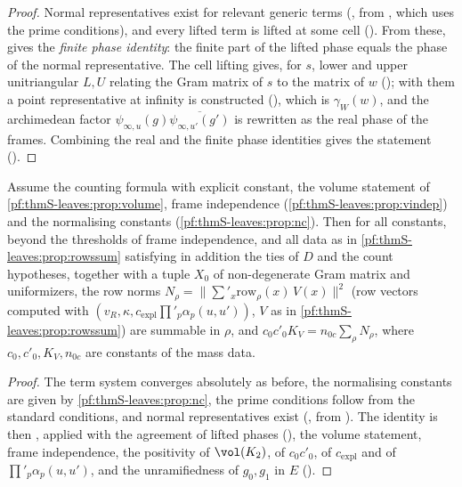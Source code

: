 \begin{proof}
Normal representatives exist for relevant generic terms
(, from , which uses the prime
conditions), and every lifted term is lifted at some cell (). From these,
 gives the \emph{finite phase identity}: the finite part of the lifted phase
equals the phase of the normal representative. The cell lifting gives, for $s$, lower and upper unitriangular $L,U$ relating the
Gram matrix of $s$ to the matrix of $w$ (); with them a point representative
at infinity is constructed (), which is $\gamma_W(w)$, and the
archimedean factor $\psi_{\infty,u}(g)\overline{\psi_{\infty,u'}(g')}$ is rewritten as the real phase of the frames. Combining the real and the
finite phase identities gives the statement ().
\end{proof}
\begin{proposition}\label{pf:thmS-leaves:prop:rowform}
Assume the counting formula with explicit constant, the volume statement of \cref{pf:thmS-leaves:prop:volume}, frame independence
(\cref{pf:thmS-leaves:prop:vindep}) and the normalising constants (\cref{pf:thmS-leaves:prop:nc}). Then for all constants, beyond the thresholds
of frame independence, and all data as in \cref{pf:thmS-leaves:prop:rowssum} satisfying in addition the ties of $D$ and the count
hypotheses, together with a tuple $X_0$ of non-degenerate Gram matrix and uniformizers, the row norms
$N_\rho=\bigl\|\sum'_x\mathrm{row}_\rho(x)\,V(x)\bigr\|^2$ (row vectors computed with $(v_R,\kappa,c_{\mathrm{expl}}\prod'_p\alpha_p(u,u'))$, $V$ as
in \cref{pf:thmS-leaves:prop:rowssum}) are summable in $\rho$, and $c_0c'_0K_V=n_{0c}\sum_\rho N_\rho$, where $c_0,c'_0,K_V,n_{0c}$ are
constants of the mass data.
\end{proposition}

\begin{proof}
The term system converges absolutely as before, the normalising constants are given by \cref{pf:thmS-leaves:prop:nc}, the prime
conditions follow from the standard conditions, and normal representatives exist
(, from ). The identity is
then , applied with the agreement of lifted phases
(), the volume statement, frame independence, the positivity of
$\vol(K_2)$, of $c_0c'_0$, of $c_{\mathrm{expl}}$ and of $\prod'_p\alpha_p(u,u')$, and the unramifiedness of $g_0,g_1$ in $E$
().
\end{proof}


